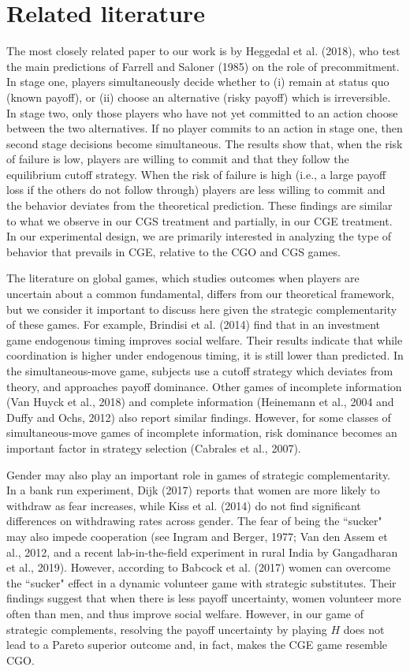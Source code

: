 \documentclass[12pt, letterpaper]{article}
\theoremstyle{plain}
\begin{document}
\section{Related literature}

The most closely related paper to our work is by Heggedal et al. (2018), who test the main predictions of Farrell and Saloner (1985) on the role of precommitment. In stage one, players simultaneously decide whether to (i) remain at status quo (known payoff), or (ii) choose an alternative (risky payoff) which is irreversible. In stage two, only those players who have not yet committed to an action choose between the two alternatives. If no player commits to an action in stage one, then second stage decisions become simultaneous. The results show that, when the risk of failure is low, players are willing to commit and that they follow the equilibrium cutoff strategy. When the risk of failure is high (i.e., a large payoff loss if the others do not follow through) players are less willing to commit and the behavior deviates from the theoretical prediction. These findings are similar to what we observe in our CGS treatment and partially, in our CGE treatment. In our experimental design, we are primarily interested in analyzing the type of behavior that prevails in CGE, relative to the CGO and CGS games.

The literature on global games, which studies outcomes when players are uncertain about a common fundamental, differs from our theoretical framework, but we consider it important to discuss here given the strategic complementarity of these games. For example, Brindisi et al. (2014) find that in an investment game endogenous timing improves social welfare. Their results indicate that while coordination is higher under endogenous timing, it is still lower than predicted. In the simultaneous-move game, subjects use a cutoff strategy which deviates from theory, and approaches payoff dominance. Other games of incomplete information (Van Huyck et al., 2018) and complete information (Heinemann et al., 2004 and Duffy and Ochs, 2012) also report similar findings. However, for some classes of simultaneous-move games of incomplete information, risk dominance becomes an important factor in strategy selection (Cabrales et al., 2007).

Gender may also play an important role in games of strategic complementarity. In a bank run experiment, Dijk (2017) reports that women are more likely to withdraw as fear increases, while Kiss et al. (2014) do not find significant differences on withdrawing rates across gender. The fear of being the ``sucker" may also impede cooperation (see Ingram and Berger, 1977; Van den Assem et al., 2012, and a recent lab-in-the-field experiment in rural India by Gangadharan et al., 2019). However, according to Babcock et al. (2017) women can overcome the ``sucker" effect in a dynamic volunteer game with strategic substitutes. Their findings suggest that when there is less payoff uncertainty, women volunteer more often than men, and thus improve social welfare. However, in our game of strategic complements, resolving the payoff uncertainty by playing $H$ does not lead to a Pareto superior outcome and, in fact, makes the CGE game resemble CGO. 
\end{document}
